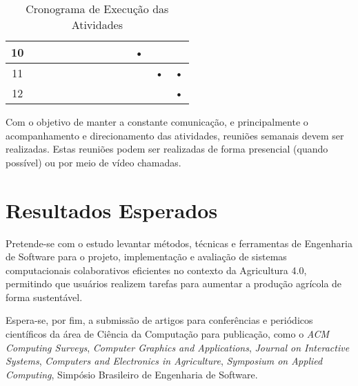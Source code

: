 \documentclass[12pt]{article}
\begin{document}
\begin{table}[htbp]
\begin{tabular}{|c|c|c|c|c|c|c|c|c|c|c|c|c|}
		10                   &            &            &           &            &            &           &            &            &           & •          &            &           \\ \hline
		11                  &            &            &           &            &            &           &            &            &        &           & •          & •         \\ \hline
		12                  &            &            &           &            &            &           &            &            &           &            &            & •         \\ \hline
		\end{tabular}
	\caption{Cronograma de Execução das Atividades}
	\label{tab:cronograma}
\end{table}

Com o objetivo de manter a constante comunicação, e principalmente o acompanhamento e direcionamento das atividades, reuniões semanais devem ser realizadas. Estas reuniões podem ser realizadas de forma presencial (quando possível) ou por meio de vídeo chamadas.

\section{Resultados Esperados}
\label{sec:resultados_esperados}

Pretende-se com o estudo levantar métodos, técnicas e ferramentas de Engenharia de Software para o projeto, implementação e avaliação de sistemas computacionais colaborativos eficientes no contexto da Agricultura 4.0, permitindo que usuários realizem tarefas para aumentar a produção agrícola de forma sustentável.

Espera-se, por fim, a submissão de artigos para conferências e periódicos científicos da área de Ciência da Computação para publicação, como o \textit{ACM Computing Surveys}, \textit{Computer Graphics and Applications}, \textit{Journal on Interactive Systems}, \textit{Computers and Electronics in Agriculture}, \textit{Symposium on Applied Computing}, Simpósio Brasileiro de Engenharia de Software.


\end{document}
